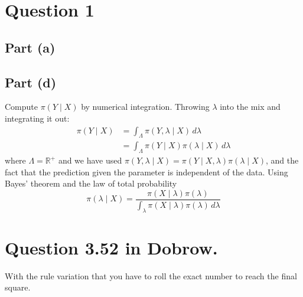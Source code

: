 \documentclass{article}
\begin{document}
\section{Question 1}
\subsection{Part (a)}
\subsection{Part (d)}
Compute $\pi(Y \mid X)$ by numerical integration.
Throwing $\lambda$ into the mix and integrating it out:
\begin{align*}
	\pi(Y \mid X) &= \int_\Lambda \pi(Y, \lambda \mid X) \, d\lambda \\
	&= \int_\Lambda \pi(Y \mid X) \pi(\lambda \mid X) \, d\lambda
\end{align*}
where $\Lambda = \mathbb R^+$ and
we have used $\pi(Y, \lambda \mid X) = \pi(Y \mid X, \lambda) \pi(\lambda \mid X)$,
and the fact that the prediction given the parameter is independent of the data.
Using Bayes' theorem and the law of total probability
$$ \pi(\lambda \mid X) = \frac{\pi(X \mid \lambda) \pi(\lambda)}{\int_\lambda \pi(X \mid \lambda) \pi(\lambda) \, d\lambda} $$

\section{Question \num{3.52} in Dobrow.}
With the rule variation that you have to roll the exact number to reach
the final square.
\end{document}
